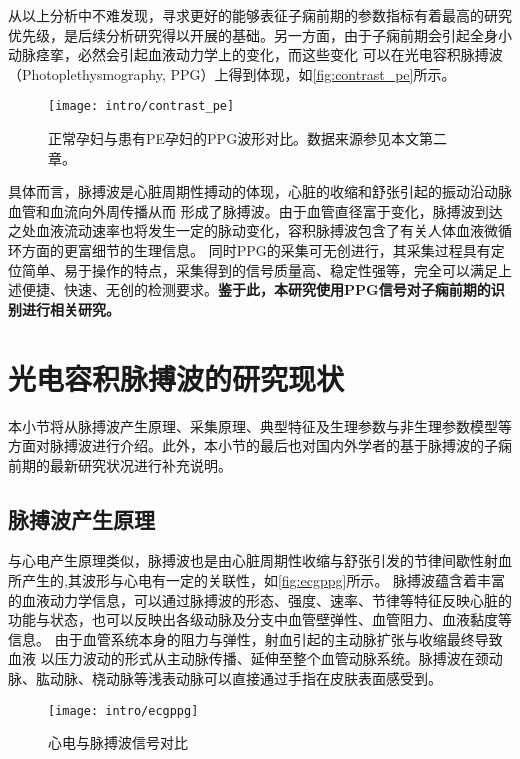 从以上分析中不难发现，寻求更好的能够表征子痫前期的参数指标有着最高的研究优先级，是后续分析研究得以开展的基础。另一方面，由于子痫前期会引起全身小动脉痉挛，必然会引起血液动力学上的变化，而这些变化
可以在光电容积脉搏波（Photoplethysmography, PPG）上得到体现，如\autoref{fig:contrast_pe}所示。
\begin{figure}[htbp]
    \centering
    \texttt{[image: intro/contrast\_pe]}
    \caption[正常孕妇与患有PE孕妇的PPG波形对比]{\label{fig:contrast_pe}正常孕妇与患有PE孕妇的PPG波形对比。数据来源参见本文第二章。}
\end{figure}

具体而言，脉搏波是心脏周期性搏动的体现，心脏的收缩和舒张引起的振动沿动脉血管和血流向外周传播从而
形成了脉搏波。由于血管直径富于变化，脉搏波到达之处血液流动速率也将发生一定的脉动变化，容积脉搏波包含了有关人体血液微循环方面的更富细节的生理信息\cite{PPGYY}。
同时PPG的采集可无创进行，其采集过程具有定位简单、易于操作的特点，采集得到的信号质量高、稳定性强等，完全可以满足上述便捷、快速、无创的检测要求。\textbf{鉴于此，本研究使用PPG信号对子痫前期的识别进行相关研究。}

\section{光电容积脉搏波的研究现状}
本小节将从脉搏波产生原理、采集原理、典型特征及生理参数与非生理参数模型等方面对脉搏波进行介绍。此外，本小节的最后也对国内外学者的基于脉搏波的子痫前期的最新研究状况进行补充说明。
\subsection{脉搏波产生原理}
与心电产生原理类似，脉搏波也是由心脏周期性收缩与舒张引发的节律间歇性射血所产生的,其波形与心电有一定的关联性，如\autoref{fig:ecgppg}所示\cite{Allen2007}。
脉搏波蕴含着丰富的血液动力学信息，可以通过脉搏波的形态、强度、速率、节律等特征反映心脏的功能与状态，也可以反映出各级动脉及分支中血管壁弹性、血管阻力、血液黏度等信息。
由于血管系统本身的阻力与弹性，射血引起的主动脉扩张与收缩最终导致血液
以压力波动的形式从主动脉传播、延伸至整个血管动脉系统。脉搏波在颈动脉、肱动脉、桡动脉等浅表动脉可以直接通过手指在皮肤表面感受到\cite{PPGYY}。
\begin{figure}[htbp]
    \centering
    \texttt{[image: intro/ecgppg]}
    \caption[心电与脉搏波信号对比]{\label{fig:ecgppg}心电与脉搏波信号对比\cite{Allen2007}}
\end{figure}

